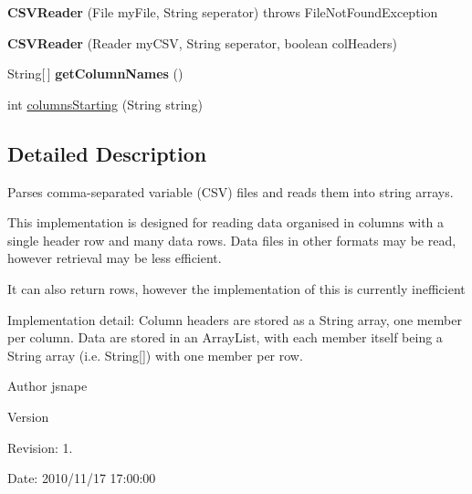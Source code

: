 \begin{DoxyCompactItemize}
\item 
\hypertarget{classuk_1_1ac_1_1dmu_1_1iesd_1_1cascade_1_1io_1_1_c_s_v_reader_ab03ea3370a025e7e97356c0b7e1cfa90}{{\bfseries C\-S\-V\-Reader} (File my\-File, String seperator)  throws File\-Not\-Found\-Exception 	}\label{classuk_1_1ac_1_1dmu_1_1iesd_1_1cascade_1_1io_1_1_c_s_v_reader_ab03ea3370a025e7e97356c0b7e1cfa90}

\item 
\hypertarget{classuk_1_1ac_1_1dmu_1_1iesd_1_1cascade_1_1io_1_1_c_s_v_reader_aeca167ed209954b477fb87461a8bb436}{{\bfseries C\-S\-V\-Reader} (Reader my\-C\-S\-V, String seperator, boolean col\-Headers)}\label{classuk_1_1ac_1_1dmu_1_1iesd_1_1cascade_1_1io_1_1_c_s_v_reader_aeca167ed209954b477fb87461a8bb436}

\item 
\hypertarget{classuk_1_1ac_1_1dmu_1_1iesd_1_1cascade_1_1io_1_1_c_s_v_reader_a9edeb2f70fd620d999e8955bde9771a9}{String\mbox{[}$\,$\mbox{]} {\bfseries get\-Column\-Names} ()}\label{classuk_1_1ac_1_1dmu_1_1iesd_1_1cascade_1_1io_1_1_c_s_v_reader_a9edeb2f70fd620d999e8955bde9771a9}

\item 
int \hyperlink{classuk_1_1ac_1_1dmu_1_1iesd_1_1cascade_1_1io_1_1_c_s_v_reader_a30cb3f8aeeb6776b1c5914f1e5d8b907}{columns\-Starting} (String string)
\end{DoxyCompactItemize}


\subsection{Detailed Description}
Parses comma-\/separated variable (C\-S\-V) files and reads them into string arrays. 

This implementation is designed for reading data organised in columns with a single header row and many data rows. Data files in other formats may be read, however retrieval may be less efficient.

It can also return rows, however the implementation of this is currently inefficient

Implementation detail\-: Column headers are stored as a String array, one member per column. Data are stored in an Array\-List, with each member itself being a String array (i.\-e. String\mbox{[}\mbox{]}) with one member per row.

\begin{DoxyAuthor}{Author}
jsnape 
\end{DoxyAuthor}
\begin{DoxyVersion}{Version}

\end{DoxyVersion}
\begin{DoxyParagraph}{Revision\-:}
1. 
\end{DoxyParagraph}
\begin{DoxyParagraph}{Date\-:}
2010/11/17 17\-:00\-:00 
\end{DoxyParagraph}


